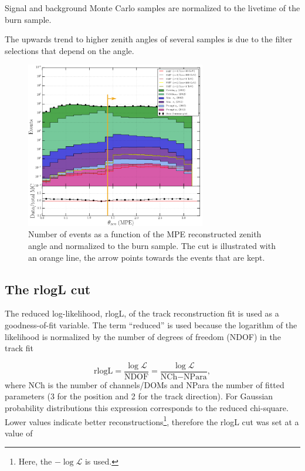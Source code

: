 Signal and background Monte Carlo samples are normalized to the livetime of the burn sample.

The upwards trend to higher zenith angles of several samples is due to the filter selections that depend on the angle. 

\begin{figure}[t]
\centering
\includegraphics[width=0.7\textwidth]{chapter8/img/1D_stack_mpefit_zenith_new.png}
\caption{Number of events as a function of the MPE reconstructed zenith angle and normalized to the burn sample. The cut is illustrated with an orange line, the arrow points towards the events that are kept.}
\label{fig:level3cutszenith}
\end{figure}


\subsection{The rlogL cut}
The reduced log-likelihood, rlogL, of the track reconstruction fit is used as a goodness-of-fit variable. The term ``reduced'' is used because the logarithm of the likelihood is normalized by the number of degrees of freedom (NDOF) in the track fit

\begin{equation}
\textrm{rlogL} = \frac{\log \mathcal{L}}{\textrm{NDOF}} = \frac{\log \mathcal{L}}{\textrm{NCh} - \textrm{NPara}},
\end{equation}
where NCh is the number of channels/DOMs and NPara the number of fitted parameters (3 for the position and 2 for the track direction). For Gaussian probability distributions this expression corresponds to the reduced chi-square. Lower values indicate better reconstructions\footnote{Here, the $-\log \mathcal{L}$ is used.}, therefore the rlogL cut was set at a value of 

